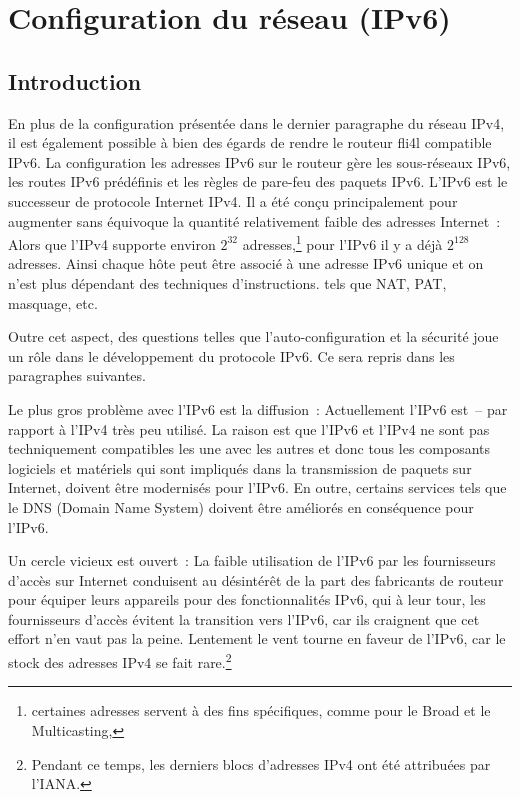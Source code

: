 
\section{Configuration du réseau (IPv6)}

\subsection{Introduction}

En plus de la configuration présentée dans le dernier paragraphe du réseau IPv4,
il est également possible à bien des égards de rendre le routeur fli4l compatible IPv6.
La configuration les adresses IPv6 sur le routeur gère les sous-réseaux IPv6, les routes IPv6
prédéfinis et les règles de pare-feu des paquets IPv6. L'IPv6 est le successeur de protocole
Internet IPv4. Il a été conçu principalement pour augmenter sans équivoque la quantité
relativement faible des adresses Internet~: Alors que l'IPv4 supporte environ \(2^{32}\) 
adresses,\footnote{certaines adresses servent à des fins spécifiques, comme pour le Broad et
le Multicasting,} pour l'IPv6 il y a déjà \(2^{128}\) adresses. Ainsi chaque hôte peut être
associé à une adresse IPv6 unique et on n'est plus dépendant des techniques d'instructions.
tels que NAT, PAT, masquage, etc.

Outre cet aspect, des questions telles que l'auto-configuration et la sécurité joue un rôle
dans le développement du protocole IPv6. Ce sera repris dans les paragraphes suivantes.

Le plus gros problème avec l'IPv6 est la diffusion~: Actuellement l'IPv6 est~-- par rapport
à l'IPv4 très peu utilisé. La raison est que l'IPv6 et l'IPv4 ne sont pas techniquement
compatibles les une avec les autres et donc tous les composants logiciels et matériels qui
sont impliqués dans la transmission de paquets sur Internet, doivent être modernisés pour
l'IPv6. En outre, certains services tels que le DNS (Domain Name System) doivent être améliorés
en conséquence pour l'IPv6.

Un cercle vicieux est ouvert~: La faible utilisation de l'IPv6 par les fournisseurs d'accès
sur Internet conduisent au désintérêt de la part des fabricants de routeur pour équiper leurs
appareils pour des fonctionnalités IPv6, qui à leur tour, les fournisseurs d'accès évitent
la transition vers l'IPv6, car ils craignent que cet effort n'en vaut pas la peine. Lentement
le vent tourne en faveur de l'IPv6, car le stock des adresses IPv4 se fait rare.\footnote{Pendant
ce temps, les derniers blocs d'adresses IPv4 ont été attribuées par l'IANA.}

